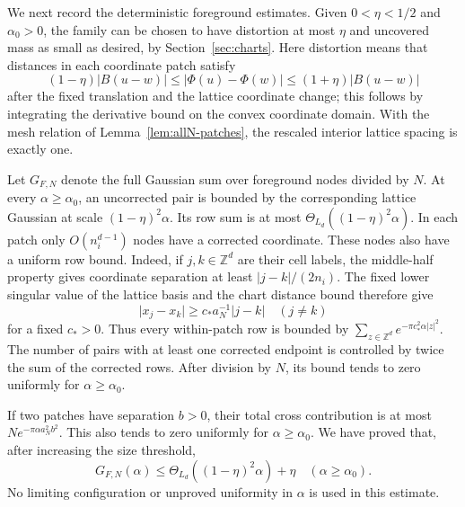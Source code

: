 \documentclass[11pt,a4paper]{article}
\theoremstyle{definition}
\newcommand{\Z}{\mathbb Z}
\newcommand{\abs}[1]{\lvert#1\rvert}
\numberwithin{equation}{section}
\begin{document}
We next record the deterministic foreground estimates. Given $0<\eta<1/2$ and $\alpha_0>0$, the family can be chosen to have distortion at most $\eta$ and uncovered mass as small as desired, by Section~\ref{sec:charts}. Here distortion means that distances in each coordinate patch satisfy
\[
 (1-\eta)\abs{B(u-w)}\le\abs{\Phi(u)-\Phi(w)}
       \le(1+\eta)\abs{B(u-w)}
\]
after the fixed translation and the lattice coordinate change; this follows by integrating the derivative bound on the convex coordinate domain. With the mesh relation of Lemma~\ref{lem:allN-patches}, the rescaled interior lattice spacing is exactly one.

Let $G_{F,N}$ denote the full Gaussian sum over foreground nodes divided by $N$. At every $\alpha\ge\alpha_0$, an uncorrected pair is bounded by the corresponding lattice Gaussian at scale $(1-\eta)^2\alpha$. Its row sum is at most $\Theta_{L_d}((1-\eta)^2\alpha)$. In each patch only $O(n_i^{d-1})$ nodes have a corrected coordinate. These nodes also have a uniform row bound. Indeed, if $j,k\in\Z^d$ are their cell labels, the middle-half property gives coordinate separation at least $\abs{j-k}/(2n_i)$. The fixed lower singular value of the lattice basis and the chart distance bound therefore give
\begin{equation}\label{eq:corrected-separation}
 \abs{x_j-x_k}\ge c_*a_N^{-1}\abs{j-k}
 \quad(j\ne k)
\end{equation}
for a fixed $c_*>0$. Thus every within-patch row is bounded by
$\sum_{z\in\Z^d}e^{-\pi c_*^2\alpha\abs z^2}$.
The number of pairs with at least one corrected endpoint is controlled by twice the sum of the corrected rows. After division by $N$, its bound tends to zero uniformly for $\alpha\ge\alpha_0$.

If two patches have separation $b>0$, their total cross contribution is at most $N e^{-\pi\alpha a_N^2b^2}$. This also tends to zero uniformly for $\alpha\ge\alpha_0$. We have proved that, after increasing the size threshold,
\begin{equation}\label{eq:foreground-window}
 G_{F,N}(\alpha)\le\Theta_{L_d}((1-\eta)^2\alpha)+\eta
                    \quad(\alpha\ge\alpha_0).
\end{equation}
No limiting configuration or unproved uniformity in $\alpha$ is used in this estimate.
\end{document}

